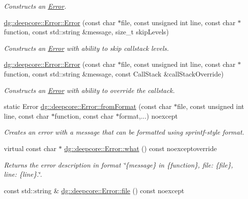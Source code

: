 \begin{DoxyCompactItemize}
\begin{DoxyCompactList}\small\item\em Constructs an \hyperlink{classdg_1_1deepcore_1_1_error}{Error}. \end{DoxyCompactList}\item 
\hyperlink{group___utility_module_ga50ae85ad2e348408fa2552abfb6570f9}{dg\+::deepcore\+::\+Error\+::\+Error} (const char $\ast$file, const unsigned int line, const char $\ast$function, const std\+::string \&message, size\+\_\+t skip\+Levels)
\begin{DoxyCompactList}\small\item\em Constructs an \hyperlink{classdg_1_1deepcore_1_1_error}{Error} with ability to skip callstack levels. \end{DoxyCompactList}\item 
\hyperlink{group___utility_module_ga3d20a4e6ef5f0579707ccf7b01f235b2}{dg\+::deepcore\+::\+Error\+::\+Error} (const char $\ast$file, const unsigned int line, const char $\ast$function, const std\+::string \&message, const Call\+Stack \&call\+Stack\+Override)
\begin{DoxyCompactList}\small\item\em Constructs an \hyperlink{classdg_1_1deepcore_1_1_error}{Error} with ability to override the callstack. \end{DoxyCompactList}\item 
static Error \hyperlink{group___utility_module_ga00500e337578c7170d2608cb93af4f51}{dg\+::deepcore\+::\+Error\+::from\+Format} (const char $\ast$file, const unsigned int line, const char $\ast$function, const char $\ast$format,...) noexcept
\begin{DoxyCompactList}\small\item\em Creates an error with a message that can be formatted using sprintf-\/style format. \end{DoxyCompactList}\item 
virtual const char $\ast$ \hyperlink{group___utility_module_ga7dff6b319144bcfcf602e0124fb0fb01}{dg\+::deepcore\+::\+Error\+::what} () const noexceptoverride
\begin{DoxyCompactList}\small\item\em Returns the error description in format \char`\"{}\{message\} in \{function\}, file\+: \{file\}, line\+: \{line\}.\char`\"{}. \end{DoxyCompactList}\item 
const std\+::string \& \hyperlink{group___utility_module_ga0b75e32780cb8534179ff3c060739496}{dg\+::deepcore\+::\+Error\+::file} () const noexcept

\end{DoxyCompactItemize}
